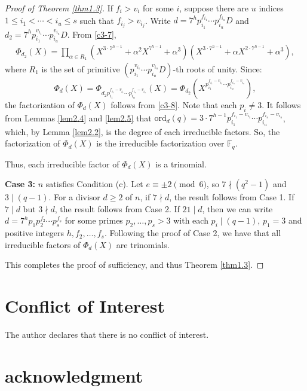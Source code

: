 \documentclass[10pt,reqno]{amsart}
\theoremstyle{definition}
\theoremstyle{remark}
\numberwithin{equation}{section}
\begin{document}
\begin{proof}[Proof of Theorem \ref{thm1.3}]
If $f_i > v_i$ for some $i$, suppose there are $u$ indices $1 \leq i_1 < \cdots < i_u \leq s$ such that $f_{i_j} > v_{i_j}$. Write $d = 7^h p_{i_1}^{f_{i_1}} \cdots p_{i_u}^{f_{i_u}} D$ and $d_2 = 7^h p_{i_1}^{v_{i_1}} \cdots p_{i_u}^{v_{i_u}} D$. From \eqref{c3-7},
\begin{align}\label{c3-8}
\Phi_{d_2}(X) = \prod_{\alpha \in R_1} (X^{3 \cdot 7^{h-1}} + \alpha^2 X^{7^{h-1}} + \alpha^3)(X^{3 \cdot 7^{h-1}} + \alpha X^{2 \cdot 7^{h-1}} + \alpha^3),
\end{align}
where $R_1$ is the set of primitive $(p_{i_1}^{v_{i_1}} \cdots p_{i_u}^{v_{i_u}} D)$-th roots of unity. Since:
\[
\Phi_d(X) = \Phi_{d_2 p_{i_1}^{f_{i_1} - v_{i_1}} \cdots p_{i_u}^{f_{i_u} - v_{i_u}}}(X) = \Phi_{d_2}(X^{p_{i_1}^{f_{i_1} - v_{i_1}} \cdots p_{i_u}^{f_{i_u} - v_{i_u}}}),
\]
the factorization of $\Phi_d(X)$ follows from \eqref{c3-8}. Note that each $p_i\ne 3$. It follows from Lemmas \ref{lem2.4} and \ref{lem2.5} that $\text{ord}_d(q) = 3 \cdot 7^{h-1} p_{i_1}^{f_{i_1} - v_{i_1}} \cdots p_{i_u}^{f_{i_u} - v_{i_u}}$, which, by Lemma \ref{lem2.2}, is the degree of each irreducible factors. So, the factorization of $\Phi_d(X)$ is the irreducible factorization over $\mathbb{F}_q$.

Thus, each irreducible factor of $\Phi_d(X)$ is a trinomial.

\textbf{Case 3:} $n$ satisfies Condition (c). Let $e\equiv \pm 2 \pmod{6}$, so $7 \nmid (q^2 - 1)$ and $3\mid (q-1)$. For a divisor $d \geq 2$ of $n$, if $7 \nmid d$, the result follows from Case 1. If $7 \mid d$ but $3\nmid d$, the result follows from Case 2. If $21\mid d$, then we can write $d=7^hp_1p_2^{f_2}\cdots p_s^{f_s}$ for some primes $p_2,\dots,p_s>3$ with each $p_i\mid (q-1)$, $p_1=3$ and positive integers $h,f_2,\dots,f_s$. Following the proof of Case 2, we have that all irreducible factors of $\Phi_d(X)$ are trinomials.

This completes the proof of sufficiency, and thus Theorem \ref{thm1.3}.
\end{proof}




\section*{Conflict of Interest}
The author declares that there is no conflict of interest.

\section*{acknowledgment}
\end{document}
